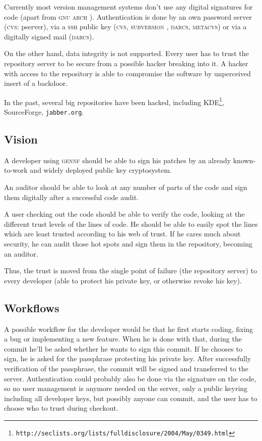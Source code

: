 \documentclass[fleqn, 10pt, a4paper]{report} \usepackage{amssymb}
\begin{document}
Currently most version management systems don't use any digital
signatures for code (apart from \textsc{gnu arch} \cite{Gnua06}).
Authentication is done
by an own password server (\textsc{cvs}: pserver), via a \textsc{ssh} public
key (\textsc{cvs}, \textsc{subversion} \cite{Subv06}, \textsc{darcs},
\textsc{metacvs}) or via a digitally signed mail (\textsc{darcs}).

On the other hand, data integrity is not supported.  Every user has to
trust the repository server to be secure from a possible hacker
breaking into it.  A hacker with access to the repository is able to
compromise the software by unperceived insert of a backdoor.

In the past, several big repositories have been hacked, including
KDE\footnote{
  \texttt{http://seclists.org/lists/fulldisclosure/2004/May/0349.html}},
SourceForge, \texttt{jabber.org}.


\subsection{Vision}

A developer using \textsc{gennf} should be able to sign his patches
by an already known-to-work and widely deployed public key
cryptosystem.

An auditor should be able to look at any number of parts of the code
and sign them digitally after a successful code audit.

A user checking out the code should be able to verify the code,
looking at the different trust levels of the lines of code. He should
be able to easily spot the lines which are least trusted according to
his web of trust. If he cares much about security, he can audit those
hot spots and sign them in the repository, becoming an auditor.

Thus, the trust is moved from the single point of failure (the
repository server) to every developer (able to protect his private
key, or otherwise revoke his key).

\subsection{Workflows}

A possible workflow for the developer would be that he first starts
coding, fixing a bug or implementing a new feature. When he is done
with that, during the commit he'll be asked whether he wants to sign
this commit.  If he chooses to sign, he is asked for the passphrase
protecting his private key. After successfully verification of the
passphrase, the commit will be signed and transferred to the server.
Authentication could probably also be done via the signature on the
code, so no user management is anymore needed on the server, only a
public keyring including all developer keys, but possibly anyone can
commit, and the user has to choose who to trust during checkout.
\end{document}
